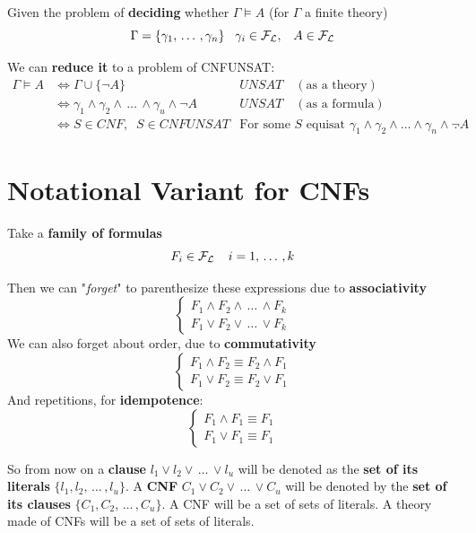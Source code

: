 \noindent
Given the problem of \textbf{deciding} whether $\Gamma \models A$ (for $\Gamma$ a finite theory)
$$ \Gamma = \{\gamma_1, \, \dots \, , \gamma_n\} \;\;\; \gamma_i \in \mathcal{F}_\mathcal{L}, \;\;\; A \in \mathcal{F}_\mathcal{L} $$

\noindent
We can \textbf{reduce it} to a problem of CNFUNSAT:
\begin{align*}
	\Gamma \models A & \Leftrightarrow \Gamma \cup \{\neg A\} &UNSAT \quad (\text{as a theory}) \\
	& \Leftrightarrow \gamma_1 \wedge \gamma_2 \wedge \, \dots \, \wedge \gamma_u \wedge \neg A &UNSAT \quad (\text{as a formula}) \\
	& \Leftrightarrow S \in CNF, \;\; S \in CNFUNSAT &\text{For some $S$ equisat $\gamma_1 \wedge \gamma_2 \wedge \dots \wedge \gamma_n \wedge \neg A$}.
\end{align*}

\section{Notational Variant for CNFs}

Take a \textbf{family of formulas}
$$ F_i \in \mathcal{F}_\mathcal{L} \;\;\;\; i = 1, \, \dots \, , k $$

\noindent
Then we can "\textit{forget}" to parenthesize these expressions due to \textbf{associativity}
$$
\begin{cases}
	F_1 \wedge F_2 \wedge \, \dots \, \wedge F_k \\
	F_1 \vee F_2 \vee \, \dots \, \vee F_k
\end{cases}
$$
We can also forget about order, due to \textbf{commutativity}
$$
\begin{cases}
	F_1 \wedge F_2 \equiv F_2 \wedge F_1  \\
	F_1 \vee F_2 \equiv F_2 \vee F_1
\end{cases}
$$
And repetitions, for \textbf{idempotence}:
$$
\begin{cases}
	F_1 \wedge F_1 \equiv F_1 \\
	F_1 \vee F_1 \equiv F_1
\end{cases}
$$

So from now on a \textbf{clause} $l_1 \vee l_2 \vee \, \dots \, \vee l_u$ will be denoted as the \textbf{set of its literals} $\{l_1, l_2, \, \dots \, , l_u\}$. A \textbf{CNF} $C_1 \vee C_2 \vee \, \dots \, \vee C_u$ will be denoted by the \textbf{set of its clauses}  $\{C_1, C_2, \, \dots \, , C_u\}$. A CNF will be a set of sets of literals. A theory made of CNFs will be a set of sets of literals.

